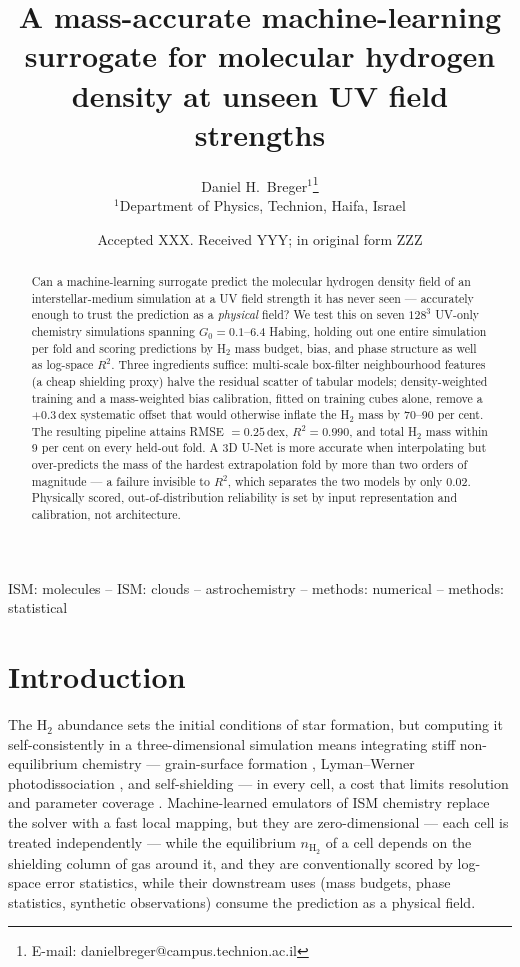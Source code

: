 \documentclass[fleqn,usenatbib]{rasti}
\title[Mass-accurate H\(_2\) surrogates at unseen UV field strengths]%
      {A mass-accurate machine-learning surrogate for molecular
       hydrogen density at unseen UV field strengths}
\author[D.~H.~Breger]{Daniel H.~Breger\(^{1}\)\thanks{E-mail: danielbreger@campus.technion.ac.il}
\\
\(^{1}\)Department of Physics, Technion,
Haifa, Israel}
\date{Accepted XXX. Received YYY; in original form ZZZ}
\newcommand{\nHH}{n_{\mathrm{H_2}}}
\newcommand{\Gzero}{G_0}
\newcommand{\dex}{\,\text{dex}}
\newcommand{\Rsq}{R^2}
\begin{document}
\label{firstpage}
\pagerange{\pageref{firstpage}--\pageref{lastpage}}
\maketitle

\begin{abstract}
Can a machine-learning surrogate predict the molecular hydrogen density
field of an interstellar-medium simulation at a UV field strength it has
never seen --- accurately enough to trust the prediction as a
\emph{physical} field? We test this on seven \(128^3\) UV-only chemistry
simulations spanning \(\Gzero = 0.1\)--6.4 Habing, holding out one entire
simulation per fold and scoring predictions by H\(_2\) mass budget, bias,
and phase structure as well as log-space \(\Rsq\). Three ingredients
suffice: multi-scale box-filter neighbourhood features (a cheap shielding
proxy) halve the residual scatter of tabular models; density-weighted
training and a mass-weighted bias calibration, fitted on training cubes
alone, remove a \(+0.3\dex\) systematic offset that would otherwise
inflate the H\(_2\) mass by 70--90 per cent. The resulting pipeline
attains RMSE \(=0.25\dex\), \(\Rsq = 0.990\), and total H\(_2\) mass within
9 per cent on every held-out fold. A 3D U-Net is more accurate when
interpolating but over-predicts the mass of the hardest extrapolation
fold by more than two orders of magnitude --- a failure invisible to
\(\Rsq\), which separates the two models by only 0.02. Physically scored,
out-of-distribution reliability is set by input representation and
calibration, not architecture.
\end{abstract}
\begin{keywords}
ISM: molecules -- ISM: clouds -- astrochemistry --
methods: numerical -- methods: statistical
\end{keywords}

\section{Introduction}
\label{sec:intro}

The H\(_2\) abundance sets the initial conditions of star formation, but
computing it self-consistently in a three-dimensional simulation means
integrating stiff non-equilibrium chemistry --- grain-surface formation
\citep{Cazaux2004}, Lyman--Werner photodissociation
\citep{Habing1968,Draine1996}, and self-shielding
\citep{Wolcott-Green2011} --- in every cell, a cost that limits
resolution and parameter coverage \citep{Grassi2014}. Machine-learned
emulators of ISM chemistry
\citep{deMijolla2019,Palud2023,Holdship2021,Grassi2022,Branca2024,Janssen2026}
replace the solver with a fast local mapping, but they are
zero-dimensional --- each cell is treated independently --- while the
equilibrium \(\nHH\) of a cell depends on the shielding column of gas
around it, and they are conventionally scored by log-space error
statistics, while their downstream uses (mass budgets, phase statistics,
synthetic observations) consume the prediction as a physical field.
\end{document}
